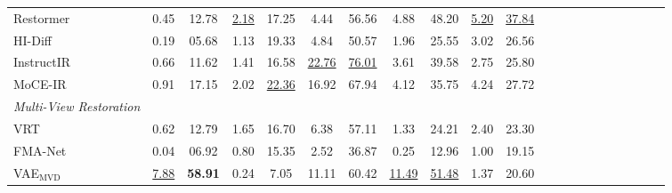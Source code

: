 \begin{table}[h]
{\begin{tabular}{lcccccccccccccccccccc}
Restormer~\cite{zamir2022restormer}
&   0.45    &       12.78
&   \underline{2.18}    &       17.25
&   4.44    &       56.56
&   4.88    &       48.20
&   \underline{5.20}    &       \underline{37.84}
\\



HI-Diff~\cite{chen2023hierarchical}
&   0.19    &       05.68
&   1.13    &       19.33
&   4.84    &       50.57
&   1.96    &       25.55
&   3.02    &       26.56
\\



InstructIR~\cite{conde2024high}
&   0.66    &       11.62
&   1.41    &       16.58
&   \underline{22.76}    &       \underline{76.01}
&   3.61    &        39.58
&   2.75    &       25.80
\\

MoCE-IR~\cite{zamfir2024complexityexperts}
&   0.91    &     17.15
&   2.02   &      \underline{22.36}
&   16.92    &     67.94  
&   4.12    &      35.75 
&   4.24    &     27.72   
\\


\midrule

\textit{Multi-View Restoration} \\
\midrule

VRT~\cite{liang2024vrt}
&    0.62   &    12.79   
&    1.65   &    16.70   
&    6.38   &    57.11   
&    1.33   &    24.21   
&    2.40   &    23.30
\\


FMA-Net~\cite{Youk_2024_CVPR}
&   0.04    &       06.92
&   0.80    &       15.35
&   2.52    &       36.87
&   0.25   &        12.96
&   1.00    &       19.15
\\


VAE$_\text{MVD}$
&    \underline{7.88}   &     \textbf{58.91  }
&    0.24   &     7.05 
&    11.11   &    60.42  
&    \underline{11.49}   &    \underline{51.48}
&    1.37   &     20.60
\\







\end{tabular}}
\end{table}
